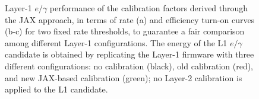 \begin{figure}
    \centering
    
    \caption{Layer-1 $e/\gamma$ performance of the calibration factors derived through the JAX approach, in terms of rate (a) and efficiency turn-on curves (b-c) for two fixed rate thresholds, to guarantee a fair comparison among different Layer-1 configurations. The energy of the L1 $e/\gamma$ candidate is obtained by replicating the Layer-1 firmware with three different configurations: no calibration (black), old calibration (red), and new JAX-based calibration (green); no Layer-2 calibration is applied to the L1 candidate.}
    \label{fig:JAX_ECAL_TurnOn}
\end{figure}

